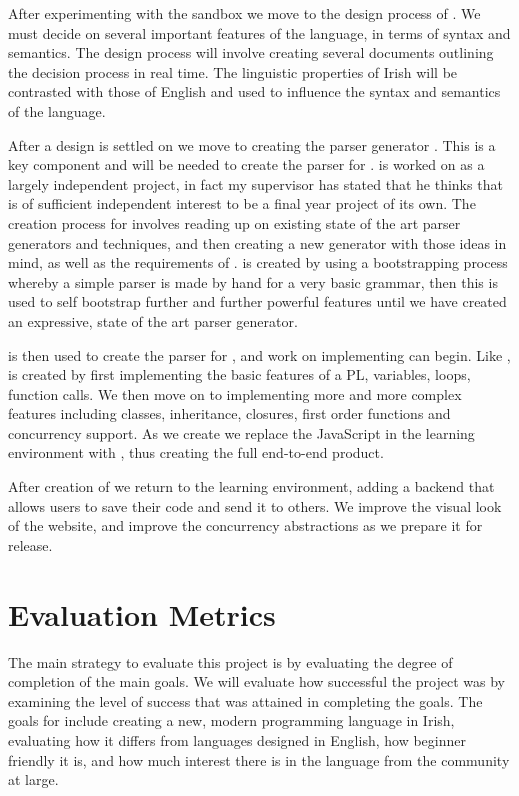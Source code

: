 After experimenting with the sandbox we move to the design process of \Setanta{}. We must decide on several important features of the language, in terms of syntax and semantics. The design process will involve creating several documents outlining the decision process in real time. The linguistic properties of Irish will be contrasted with those of English and used to influence the syntax and semantics of the language.

After a design is settled on we move to creating the parser generator \tsPEG{}. This is a key component and will be needed to create the parser for \Setanta{}. \tsPEG{} is worked on as a largely independent project, in fact my supervisor has stated that he thinks that \tsPEG{} is of sufficient independent interest to be a final year project of its own. The creation process for \tsPEG{} involves reading up on existing state of the art parser generators and techniques, and then creating a new generator with those ideas in mind, as well as the requirements of \Setanta{}. \tsPEG{} is created by using a bootstrapping process whereby a simple parser is made by hand for a very basic grammar, then this is used to self bootstrap further and further powerful features until we have created an expressive, state of the art parser generator.

\tsPEG{} is then used to create the parser for \Setanta{}, and work on implementing \Setanta{} can begin. Like \tsPEG{}, \Setanta{} is created by first implementing the basic features of a PL, variables, loops, function calls. We then move on to implementing more and more complex features including classes, inheritance, closures, first order functions and concurrency support. As we create \Setanta{} we replace the JavaScript in the learning environment with \Setanta{}, thus creating the full end-to-end product.

After creation of \Setanta{} we return to the learning environment, adding a backend that allows users to save their code and send it to others. We improve the visual look of the website, and improve the concurrency abstractions as we prepare it for release.

\section{Evaluation Metrics}

The main strategy to evaluate this project is by evaluating the degree of completion of the main goals. We will evaluate how successful the project was by examining the level of success that was attained in completing the goals. The goals for \Setanta{} include creating a new, modern programming language in Irish, evaluating how it differs from languages designed in English, how beginner friendly it is, and how much interest there is in the language from the community at large.

